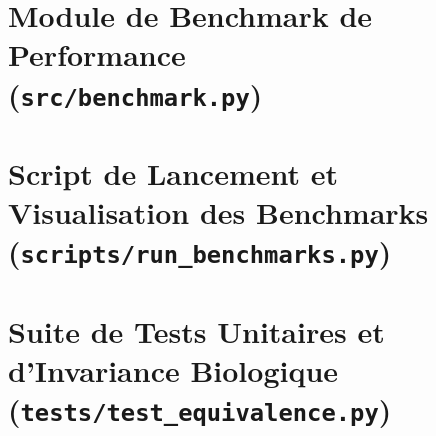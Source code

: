 \documentclass[11pt,a4paper]{report}
\theoremstyle{plain}
\theoremstyle{definition}
\theoremstyle{remark}
\begin{document}
\section[Moteur de Benchmarks (benchmark.py)]{Module de Benchmark de Performance\\\large(\texttt{src/benchmark.py})}


\newpage
\section[Script de Lancement des Benchmarks (run\_benchmarks.py)]{Script de Lancement et Visualisation des Benchmarks\\\large(\texttt{scripts/run\_benchmarks.py})}


\newpage
\section[Suite de Tests d'Équivalence (test\_equivalence.py)]{Suite de Tests Unitaires et d'Invariance Biologique\\\large(\texttt{tests/test\_equivalence.py})}

\end{document}
